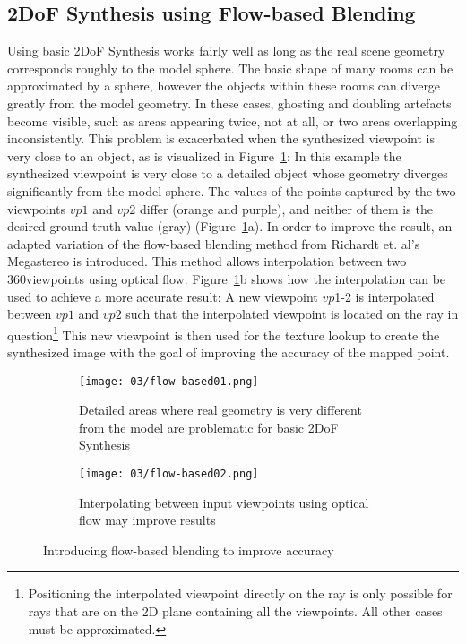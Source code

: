 \subsection{2DoF Synthesis using Flow-based Blending}
Using basic 2DoF Synthesis works fairly well as long as the real scene geometry corresponds roughly to the model sphere. The basic shape of many rooms can be approximated by a sphere, however the objects within these rooms can diverge greatly from the model geometry. In these cases, ghosting and doubling artefacts become visible, such as areas appearing twice, not at all, or two areas overlapping inconsistently. This problem is exacerbated when the synthesized viewpoint is very close to an object, as is visualized in Figure~\ref{fig:flow-based-mot}: In this example the synthesized viewpoint is very close to a detailed object whose geometry diverges significantly from the model sphere. The values of the points captured by the two viewpoints $vp1$ and $vp2$ differ (orange and purple), and neither of them is the desired ground truth value (gray) (Figure~\ref{fig:flow-based-mot}a). In order to improve the result, an adapted variation of the flow-based blending method from Richardt et. al's Megastereo \cite{megastereo} is introduced. This method allows interpolation between two 360\degree viewpoints using optical flow. Figure~\ref{fig:flow-based-mot}b shows how the interpolation can be used to achieve a more accurate result: A new viewpoint $vp$1-2 is interpolated between $vp1$ and $vp2$ such that the interpolated viewpoint is located on the ray in question\footnote{Positioning the interpolated viewpoint directly on the ray is only possible for rays that are on the 2D plane containing all the viewpoints. All other cases must be approximated.} This new viewpoint is then used for the texture lookup to create the synthesized image with the goal of improving the accuracy of the mapped point.

\begin{figure}
\centering
    \hfill
    \begin{subfigure}[t]{0.4\textwidth}            
            \centering
            \texttt{[image: 03/flow-based01.png]}
            \caption{Detailed areas where real geometry is very different from the model are problematic for basic 2DoF Synthesis}
    \end{subfigure}%
    \hfill
    \begin{subfigure}[t]{0.4\textwidth}
            \centering
            \texttt{[image: 03/flow-based02.png]}
            \caption{Interpolating between input viewpoints using optical flow may improve results}
    \end{subfigure}
    \hfill
    \hfill
  \caption[Flow-based blending to improve accuracy in close, detailed areas]{Introducing flow-based blending to improve accuracy} \label{fig:flow-based-mot}
\end{figure}

